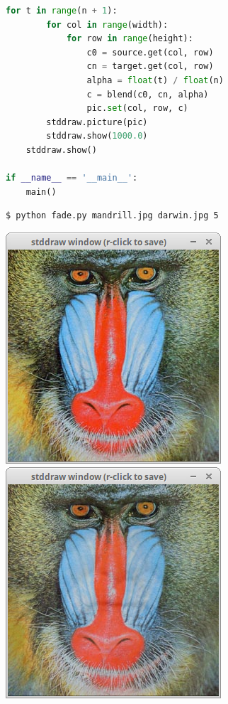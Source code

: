 \documentclass[8pt,a4paper,compress,handout]{beamer}
\begin{document}
\begin{frame}[fragile]
\begin{lstlisting}[language=Python]
    for t in range(n + 1):
        for col in range(width):
            for row in range(height):
                c0 = source.get(col, row)
                cn = target.get(col, row)
                alpha = float(t) / float(n)
                c = blend(c0, cn, alpha)
                pic.set(col, row, c)
        stddraw.picture(pic)
        stddraw.show(1000.0)
    stddraw.show()

if __name__ == '__main__':
    main()
\end{lstlisting}

\begin{lstlisting}[language={}]
$ python fade.py mandrill.jpg darwin.jpg 5
\end{lstlisting}
\begin{minipage}{300pt}
\begin{center}
\includegraphics[scale=0.15]{figures/fade1.png}\hfill
\includegraphics[scale=0.15]{figures/fade2.png}\hfill

\end{center}
\end{minipage}
\end{frame}
\end{document}
